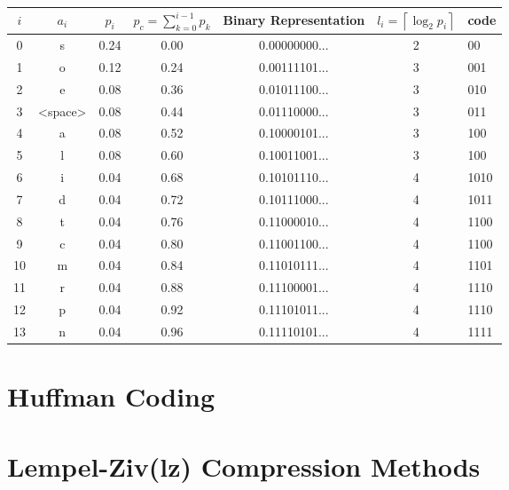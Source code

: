 \documentclass{article}
\begin{document}
\begin{center}
	\begin{tabular}{ccccccl}
		\toprule
		$i$ & $a_{i}$ &     $p_{i}$ &  $p_{c} = \sum\limits_{k=0}^{i-1} p_{k}$ &    Binary Representation &  $l_{i} = \left \lceil \log_{2} p_{i} \right \rceil$ &  code \\
		\midrule
		0  &        s &  0.24 &          0.00 &  0.00000000... &               2 &    00 \\
		1  &        o &  0.12 &          0.24 &  0.00111101... &               3 &   001 \\
		2  &        e &  0.08 &          0.36 &  0.01011100... &               3 &   010 \\
		3  &   <space>  &  0.08 &          0.44 &  0.01110000... &               3 &   011 \\
		4  &        a &  0.08 &          0.52 &  0.10000101... &               3 &   100 \\
		5  &        l &  0.08 &          0.60 &  0.10011001... &               3 &   100 \\
		6  &        i &  0.04 &          0.68 &  0.10101110... &               4 &  1010 \\
		7  &        d &  0.04 &          0.72 &  0.10111000... &               4 &  1011 \\
		8  &        t &  0.04 &          0.76 &  0.11000010... &               4 &  1100 \\
		9  &        c &  0.04 &          0.80 &  0.11001100... &               4 &  1100 \\
		10 &        m &  0.04 &          0.84 &  0.11010111... &               4 &  1101 \\
		11 &        r &  0.04 &          0.88 &  0.11100001... &               4 &  1110 \\
		12 &        p &  0.04 &          0.92 &  0.11101011... &               4 &  1110 \\
		13 &        n &  0.04 &          0.96 &  0.11110101... &               4 &  1111 \\
		\bottomrule
	\end{tabular}
\end{center}


 
\section {Huffman Coding}

\section{Lempel-Ziv(lz) Compression Methods}
\end{document}
